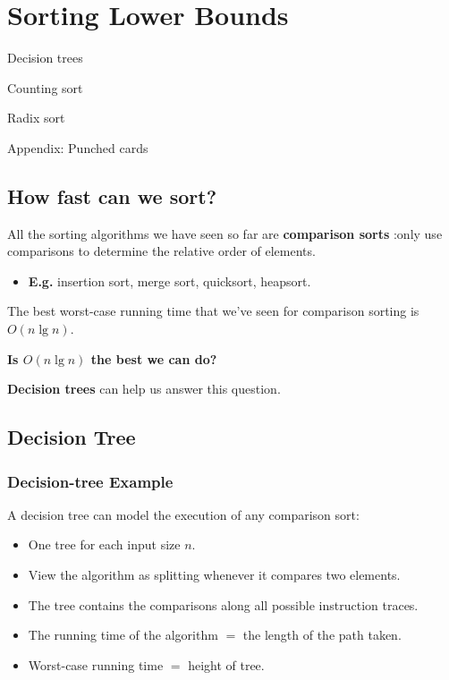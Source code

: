 \documentclass[11pt,toc=twocol]{elegantbook}
\begin{document}
\chapter{Sorting Lower Bounds}
\begin{introduction}
    \item Decision trees
    \item Counting sort
    \item Radix sort
    \item Appendix: Punched cards
\end{introduction}
\section{How fast can we sort?}
All the sorting algorithms we have seen so far are \textbf{comparison sorts} :only use comparisons to determine the relative order of elements.

\begin{itemize}
    \item \textbf{E.g.} insertion sort, merge sort, quicksort, heapsort.
\end{itemize}

The best worst-case running time that we've seen for comparison sorting is $O(n \lg n)$.

\begin{center}
    \textbf{Is $O(n \lg n)$ the best we can do?}
\end{center}

\textbf{Decision trees} can help us answer this question.

\section{Decision Tree}
\subsection{Decision-tree Example}
\begin{definition}
    A decision tree can model the execution of any comparison sort:
    \begin{itemize}
        \item One tree for each input size $n$.
        \item View the algorithm as splitting whenever it compares two elements.
        \item The tree contains the comparisons along all possible instruction traces.
        \item The running time of the algorithm $=$ the length of the path taken.
        \item Worst-case running time $=$ height of tree.
    \end{itemize}
\end{definition}
\end{document}
